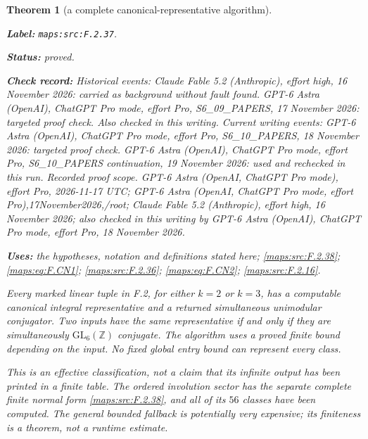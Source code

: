 \documentclass[11pt,a4paper]{article}
\newtheorem{theorem}{Theorem}[section]
\theoremstyle{definition}
\newcommand{\StatementRecord}[4]{\par\smallskip\begingroup\upshape\raggedright\noindent\textbf{Label:} \nolinkurl{#1}.\par\noindent\textbf{Status:} #2.\par\noindent\textbf{Check record:} #3.\par\noindent\textbf{Uses:} #4.\par\endgroup\smallskip}
\begin{document}
\begin{theorem}[a complete canonical-representative algorithm]\label{maps:src:F.2.37}
\StatementRecord{maps:src:F.2.37}{proved}{Historical events: Claude Fable 5.2 (Anthropic), effort high, 16 November 2026: carried as background without fault found. GPT-6 Astra (OpenAI), ChatGPT Pro mode, effort Pro, S6\_09\_PAPERS, 17 November 2026: targeted proof check. Also checked in this writing. Current writing events: GPT-6 Astra (OpenAI), ChatGPT Pro mode, effort Pro, S6\_10\_PAPERS, 18 November 2026: targeted proof check. GPT-6 Astra (OpenAI), ChatGPT Pro mode, effort Pro, S6\_10\_PAPERS continuation, 19 November 2026: used and rechecked in this run. \emph{Recorded proof scope.} GPT-6 Astra (OpenAI, ChatGPT Pro mode), effort Pro, 2026-11-17 UTC; GPT-6 Astra (OpenAI, ChatGPT Pro mode, effort Pro),17November2026,/root; Claude Fable 5.2 (Anthropic), effort high, 16 November 2026; also checked in this writing by GPT-6 Astra (OpenAI), ChatGPT Pro mode, effort Pro, 18 November 2026}{the hypotheses, notation and definitions stated here; \cref{maps:src:F.2.38}; \cref{maps:eq:F.CN1}; \cref{maps:src:F.2.36}; \cref{maps:eq:F.CN2}; \cref{maps:src:F.2.16}}


Every marked linear tuple in F.2, for either $k=2$ or $k=3$,
has a computable canonical integral representative and a
returned simultaneous unimodular conjugator. Two inputs have
the same representative if and only if they are simultaneously
$\mathrm{GL}_6(\mathbb Z)$ conjugate. The algorithm uses a proved
finite bound depending on the input. No fixed global entry bound
can represent every class.

This is an effective classification, not a claim that its
infinite output has been printed in a finite table. The
ordered involution sector has the separate complete finite
normal form \ref{maps:src:F.2.38}, and all of its $56$ classes have been
computed. The general bounded fallback is potentially very
expensive; its finiteness is a theorem, not a runtime estimate.

\end{theorem}
\end{document}

